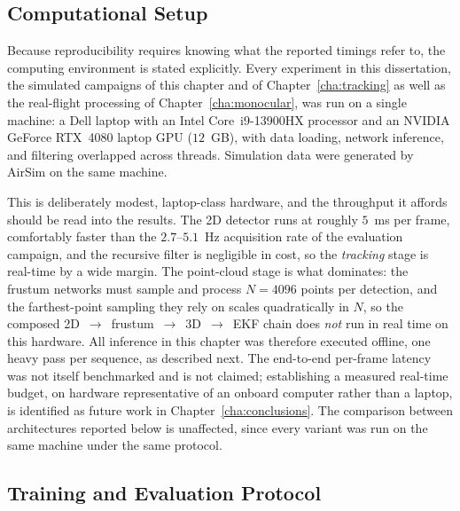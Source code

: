 \subsection{Computational Setup}
\label{sec:compute}

Because reproducibility requires knowing what the reported timings refer to, the
computing environment is stated explicitly. Every experiment in this dissertation,
the simulated campaigns of this chapter and of Chapter~\ref{cha:tracking} as well
as the real-flight processing of Chapter~\ref{cha:monocular}, was run on a single
machine: a Dell laptop with an Intel Core~i9-13900HX processor and an NVIDIA
GeForce RTX~4080 laptop GPU ($12$~GB), with data loading, network inference, and filtering
overlapped across threads. Simulation data were generated by AirSim on the same
machine.

This is deliberately modest, laptop-class hardware, and the throughput it affords
should be read into the results. The 2D detector runs at roughly $5$~ms per frame,
comfortably faster than the $2.7$--$5.1$~Hz acquisition rate of the evaluation
campaign, and the recursive filter is negligible in cost, so the
\emph{tracking} stage is real-time by a wide margin. The point-cloud stage is
what dominates: the frustum networks must sample and process $N=4096$ points per
detection, and the farthest-point sampling they rely on scales quadratically in
$N$, so the composed
2D~$\rightarrow$~frustum~$\rightarrow$~3D~$\rightarrow$~EKF chain does \emph{not}
run in real time on this hardware. All inference in this chapter was therefore
executed offline, one heavy pass per sequence, as described next. The end-to-end
per-frame latency was not itself benchmarked and is not claimed; establishing a
measured real-time budget, on hardware representative of an onboard computer
rather than a laptop, is identified as future work in
Chapter~\ref{cha:conclusions}. The comparison between architectures reported below
is unaffected, since every variant was run on the same machine under the same
protocol.

\subsection{Training and Evaluation Protocol}

